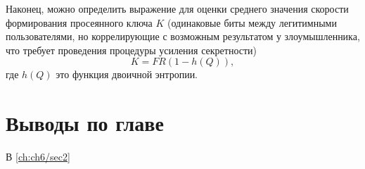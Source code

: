 Наконец, можно определить выражение для оценки среднего значения скорости формирования просеянного ключа $K$ (одинаковые биты между легитимными пользователями, но коррелирующие с возможным результатом у злоумышленника, что требует проведения процедуры усиления секретности)
\begin{equation}
    K=FR(1-h(Q)),
\end{equation}
где $h(Q)$ это функция двоичной энтропии. 

\pagebreak

\section{Выводы по главе} \label{ch:ch6/sec9}


В \ref{ch:ch6/sec2}  

\pagebreak

